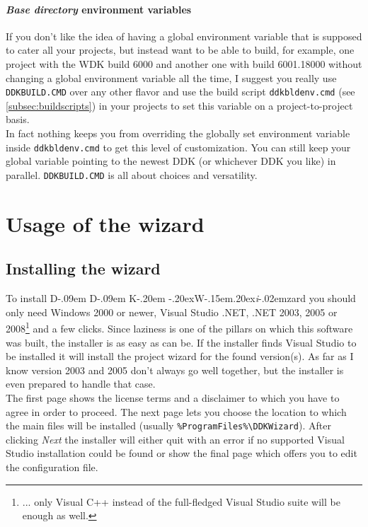\documentclass[a4paper,titlepage]{report}
\def\ddkwiz{D\kern-.09em D\kern-.09em K\kern-.20em \raise-.20ex\hbox{W}\kern-.15em\raise.20ex\hbox{\it{i}}\kern-.02em{zard}}
\begin{document}
\subsubsection{\emph{Base directory} environment variables}
\label{subsubsec:basedir}
If you don't like the idea of having a global environment variable that is supposed to cater all your
projects, but instead want to be able to build, for example, one project with the WDK build 6000 and
another one with build 6001.18000 without changing a global environment variable all the time, I suggest
you really use \texttt{DDKBUILD.CMD} over any other flavor and use the build script \texttt{ddkbldenv.cmd}
(see \autoref{subsec:buildscripts}) in your projects to set this variable on a project-to-project basis.\\
In fact nothing keeps you from overriding the globally set environment variable inside \texttt{ddkbldenv.cmd}
to get this level of customization. You can still keep your global variable pointing to the newest DDK (or
whichever DDK you like) in parallel. \texttt{DDKBUILD.CMD} is all about choices and versatility.

\chapter{Usage of the wizard}\thispagestyle{fancy}
\section{Installing the wizard}
To install \ddkwiz{} you should only need Windows 2000 or newer, Visual Studio .NET,
.NET 2003, 2005 or 2008\footnote{... only
Visual C++ instead of the full-fledged Visual Studio suite will be enough as well.}
and a few clicks. Since laziness is one of the pillars on which this software was
built, the installer is as easy as can be.
If the installer finds Visual Studio to be installed it will install the
project wizard for the found version(s). As far as I know version 2003 and 2005
don't always go well together, but the installer is even prepared to handle that case.\\

The first page shows the license terms and a disclaimer to which you have to agree
in order to proceed. The next page lets you choose the location to which the
main files will be installed (usually \verb+%ProgramFiles%\DDKWizard+). After
clicking \emph{Next} the installer will either quit with an error if no supported
Visual Studio installation could be found or show the final page which offers
you to edit the configuration file.\\
\end{document}
